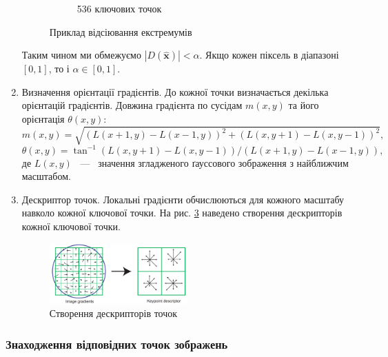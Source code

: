 \begin{enumerate}
\begin{figure}[H]
\begin{subfigure}[c]{0.3\textwidth}
                  \caption{ 536 ключових точок
                      \label{fig:swift5}
                  }
              \end{subfigure}
              \caption{Приклад відсіювання екстремумів \cite{sift}
                  \label{fig:sift45}
              }
          \end{figure}
          Таким чином  ми обмежуємо $|D(\widehat{\boldsymbol{x}})| < \alpha$.
          Якщо кожен піксель в діапазоні $[0,1]$, то і
          $ \alpha \in [0,1]$.
    \item Визначення орієнтації градієнтів.
          До кожної точки визначається декілька орієнтацій градієнтів.
          Довжина градієнта по сусідам $m(x,y)$ та його орієнтація $\theta(x,y)$:
          \begin{equation*}
              m(x,y) = \sqrt{(L(x+1,y) - L(x-1,y))^2 + (L(x,y+1) - L(x,y-1))^2},
          \end{equation*}
          \begin{equation*}
              \theta(x,y) = \tan^{-1} (L(x,y+1) - L(x,y-1))/(L(x+1,y) - L(x-1,y)),
          \end{equation*}
          де $L(x,y)$ ~---~ значення згладженого ґауссового зображення з найближчим масштабом.

    \item Дескриптор точок.
          Локальні градієнти обчислюються для кожного масштабу навколо кожної ключової точки.
          На рис. \ref{fig:swift6} наведено створення дескрипторів кожної ключової точки.
          \begin{figure}[H]
              \centering
              \includegraphics[width=0.5\textwidth]{images/sift6}
              \caption{Створення дескрипторів точок \cite{sift}
                  \label{fig:swift6}
              }
          \end{figure}
\end{enumerate}

\subsubsection{Знаходження відповідних точок зображень}

